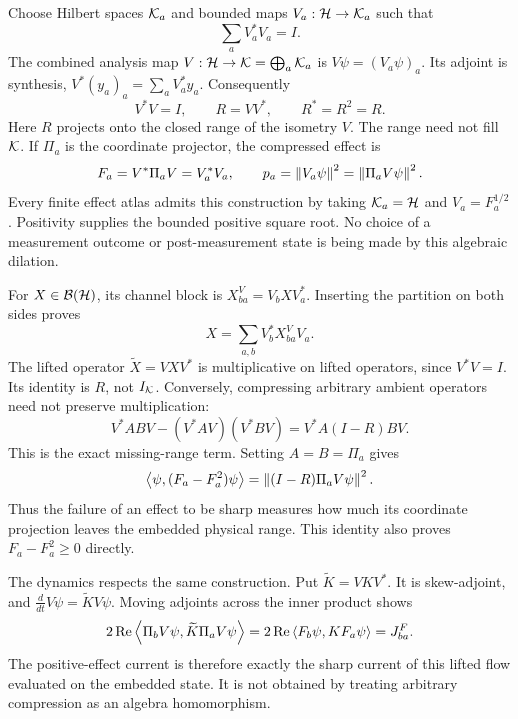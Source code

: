 Choose Hilbert spaces $\mathcal K_a$ and bounded maps $V_a:\mathcal H\to\mathcal K_a$ such that
\[
 \sum_aV_a^*V_a=I.
\]
The combined analysis map $V:\mathcal H\to\mathcal K=\bigoplus_a\mathcal K_a$ is $V\psi=(V_a\psi)_a$. Its adjoint is synthesis, $V^*(y_a)_a=\sum_aV_a^*y_a$. Consequently
\[
 V^*V=I,\qquad R=VV^*,\qquad R^*=R^2=R.
\]
Here $R$ projects onto the closed range of the isometry $V$. The range need not fill $\mathcal K$. If $\Pi_a$ is the coordinate projector, the compressed effect is
\[
 F_a=V^*\Pi_aV=V_a^*V_a,\qquad
 p_a=\left\lVert V_a\psi\right\rVert^2=\left\lVert\Pi_aV\psi\right\rVert^2.
\]
Every finite effect atlas admits this construction by taking $\mathcal K_a=\mathcal H$ and $V_a=F_a^{1/2}$. Positivity supplies the bounded positive square root. No choice of a measurement outcome or post-measurement state is being made by this algebraic dilation.

For $X\in\mathcal B(\mathcal H)$, its channel block is $X_{ba}^{V}=V_bXV_a^*$. Inserting the partition on both sides proves
\begin{equation}
 X=\sum_{a,b}V_b^*X_{ba}^{V}V_a.
 \label{eq:foundation-channel-reconstruction}
\end{equation}
The lifted operator $\widetilde X=VXV^*$ is multiplicative on lifted operators, since $V^*V=I$. Its identity is $R$, not $I_{\mathcal K}$. Conversely, compressing arbitrary ambient operators need not preserve multiplication:
\begin{equation}
 V^*ABV-(V^*AV)(V^*BV)=V^*A(I-R)BV.
 \label{eq:foundation-compression-defect}
\end{equation}
This is the exact missing-range term. Setting $A=B=\Pi_a$ gives
\begin{equation}
 \left\langle\psi,(F_a-F_a^2)\psi\right\rangle
 =\left\lVert(I-R)\Pi_aV\psi\right\rVert^2.
 \label{eq:foundation-unsharpness}
\end{equation}
Thus the failure of an effect to be sharp measures how much its coordinate projection leaves the embedded physical range. This identity also proves $F_a-F_a^2\geq0$ directly.

The dynamics respects the same construction. Put $\widetilde K=VKV^*$. It is skew-adjoint, and $\frac{d}{dt}V\psi=\widetilde K V\psi$. Moving adjoints across the inner product shows
\[
 2\operatorname{Re}\left\langle\Pi_bV\psi,\widetilde K\Pi_aV\psi\right\rangle
 =2\operatorname{Re}\left\langle F_b\psi,KF_a\psi\right\rangle=J^F_{ba}.
\]
The positive-effect current is therefore exactly the sharp current of this lifted flow evaluated on the embedded state. It is not obtained by treating arbitrary compression as an algebra homomorphism.




